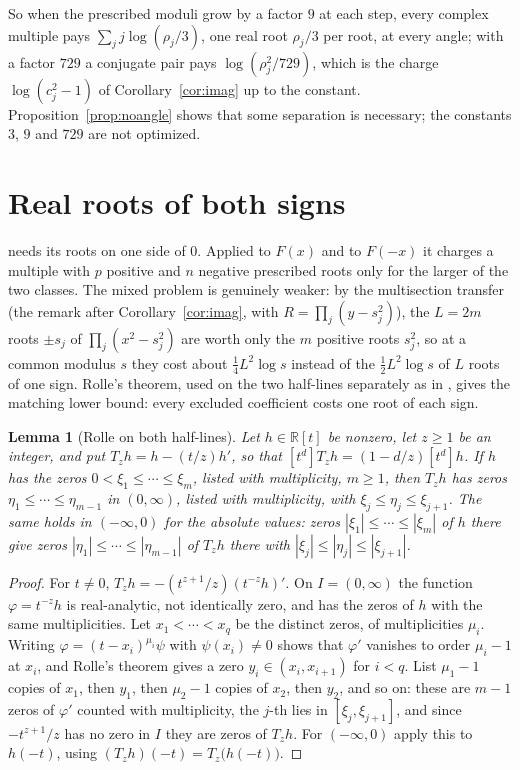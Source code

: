 \documentclass[11pt]{article}
\newtheorem{lemma}[theorem]{Lemma}
\newcommand{\R}{\mathbb R}
\begin{document}
So when the prescribed moduli grow by a factor $9$ at each step, every
complex multiple pays $\sum_jj\log(\rho_j/3)$, one real root $\rho_j/3$ per
root, at every angle; with a factor $729$ a conjugate pair pays
$\log(\rho_j^2/729)$, which is the charge $\log(c_j^2-1)$ of
Corollary~\ref{cor:imag} up to the constant.  Proposition~\ref{prop:noangle}
shows that some separation is necessary; the constants $3$, $9$ and $729$ are
not optimized.

\section{Real roots of both signs}\label{sec:bothsigns}

\cite[Theorem~3.2]{coefficient-mass} needs its roots on one side of $0$.  Applied to $F(x)$
and to $F(-x)$ it charges a multiple with $p$ positive and $n$ negative
prescribed roots only for the larger of the two classes.  The mixed problem is
genuinely weaker: by the multisection transfer (the remark after
Corollary~\ref{cor:imag}, with $R=\prod_j(y-s_j^2)$), the $L=2m$ roots $\pm s_j$
of $\prod_j(x^2-s_j^2)$ are worth only the $m$ positive roots $s_j^2$, so at a
common modulus $s$ they cost about $\frac14L^2\log s$ instead of the
$\frac12L^2\log s$ of $L$ roots of one sign.  Rolle's theorem, used on the two
half-lines separately as in \cite[Proposition~4.2]{coefficient-mass}, gives the
matching lower bound: every excluded coefficient costs one root of each sign.

\begin{lemma}[Rolle on both half-lines]\label{lem:rolleside}
Let $h\in\R[t]$ be nonzero, let $z\ge1$ be an integer, and put
$T_zh=h-(t/z)h'$, so that $[t^d]T_zh=(1-d/z)[t^d]h$.  If $h$ has the zeros
$0<\xi_1\le\cdots\le\xi_m$, listed with multiplicity, $m\ge1$, then $T_zh$ has
zeros $\eta_1\le\cdots\le\eta_{m-1}$ in $(0,\infty)$, listed with multiplicity,
with $\xi_j\le\eta_j\le\xi_{j+1}$.  The same holds in $(-\infty,0)$ for the
absolute values: zeros $|\xi_1|\le\cdots\le|\xi_m|$ of $h$ there give zeros
$|\eta_1|\le\cdots\le|\eta_{m-1}|$ of $T_zh$ there with
$|\xi_j|\le|\eta_j|\le|\xi_{j+1}|$.
\end{lemma}

\begin{proof}
For $t\ne0$, $T_zh=-(t^{z+1}/z)(t^{-z}h)'$.  On $I=(0,\infty)$ the function
$\varphi=t^{-z}h$ is real-analytic, not identically zero, and has the zeros of
$h$ with the same multiplicities.  Let $x_1<\cdots<x_q$ be the distinct zeros,
of multiplicities $\mu_i$.  Writing $\varphi=(t-x_i)^{\mu_i}\psi$ with
$\psi(x_i)\ne0$ shows that $\varphi'$ vanishes to order $\mu_i-1$ at $x_i$,
and Rolle's theorem gives a zero $y_i\in(x_i,x_{i+1})$ for $i<q$.  List
$\mu_1-1$ copies of $x_1$, then $y_1$, then $\mu_2-1$ copies of $x_2$, then
$y_2$, and so on: these are $m-1$ zeros of $\varphi'$ counted with
multiplicity, the $j$-th lies in $[\xi_j,\xi_{j+1}]$, and since
$-t^{z+1}/z$ has no zero in $I$ they are zeros of $T_zh$.  For
$(-\infty,0)$ apply this to $h(-t)$, using $(T_zh)(-t)=T_z\bigl(h(-t)\bigr)$.
\end{proof}
\end{document}
